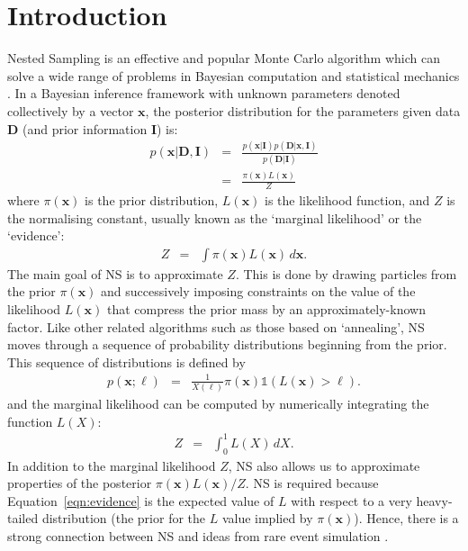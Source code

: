 \documentclass[journal,article,accept,moreauthors,pdftex,12pt,a4paper]{mdpi}
\newcommand{\xx}{\boldsymbol{x}}
\newcommand{\dx}{d\boldsymbol{x}}
\newcommand{\data}{\boldsymbol{D}}
\newcommand{\II}{\boldsymbol{I}}
\begin{document}

\section{Introduction}

Nested Sampling \citep[NS][]{skilling} is an effective and popular
Monte Carlo algorithm which can solve a wide range of problems in Bayesian
computation and statistical mechanics
\citep{2009arXiv0906.3544P, 2014PhRvE..89b2302P, 2015arXiv150303404B}.
In a Bayesian inference framework with unknown parameters denoted collectively
by a vector $\xx$, the
posterior distribution for the parameters given data $\data$ (and prior
information $\II$) is:
\begin{eqnarray}
p(\xx | \data, \II) &=&
\frac{p(\xx | \II)p(\data | \xx, \II)}{p(\data | \II)}\\
&=& \frac{\pi(\xx)L(\xx)}{Z}
\end{eqnarray}
where $\pi(\xx)$ is the prior distribution, $L(\xx)$ is the likelihood
function, and $Z$ is the normalising constant, usually known as the
`marginal likelihood' or the `evidence':
\begin{eqnarray}
Z &=& \int \pi(\xx) L(\xx) \, \dx.\label{eqn:evidence}
\end{eqnarray}
The main goal of NS is to approximate $Z$.
This is done by drawing particles from the
prior $\pi(\xx)$ and successively imposing constraints on the value of
the likelihood $L(\xx)$ that compress the prior mass by an
approximately-known factor. Like other related algorithms such as those
based on `annealing', NS
moves through a sequence of probability distributions beginning from the
prior. This sequence of distributions is defined by
\begin{eqnarray}
p(\xx; \ell) &=& \frac{1}{X(\ell)}\pi(\xx)\mathds{1}\left(L(\xx) > \ell\right).
\end{eqnarray}
and the marginal likelihood can be computed by numerically integrating the
function $L(X)$:
\begin{eqnarray}
Z &=& \int_0^1 L(X)\, dX.
\end{eqnarray}
In addition to the marginal likelihood $Z$, NS also allows us
to approximate properties of the posterior $\pi(\xx)L(\xx)/Z$.
NS is required because Equation~\ref{eqn:evidence}
is the expected value of $L$ with respect to a very heavy-tailed distribution
(the prior for the $L$ value implied by $\pi(\xx)$). Hence, there is a strong
connection between NS and ideas from rare event simulation \citep{walter}.
\end{document}
